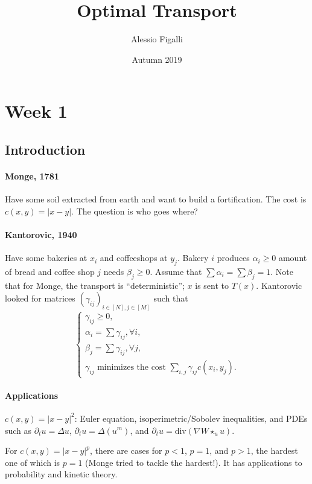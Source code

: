 \documentclass[oneside,leqno,11pt]{amsart}
\numberwithin{equation}{section}
\begin{document}
\title{Optimal Transport}
\author{Alessio Figalli}
\date{Autumn 2019}

\maketitle

\section{Week 1}
\subsection{Introduction}
\paragraph{Monge, 1781} Have some soil extracted from earth and want to build a fortification. The cost is $c(x,y) = |x-y|$. The question is who goes where?

\paragraph{Kantorovic, 1940} Have some bakeries at $x_i$ and coffeeshops at $y_j$. Bakery $i$ produces $\alpha_i \geq 0$ amount of bread and coffee shop $j$ needs $\beta_j \geq 0$. Assume that $\sum \alpha_i = \sum \beta_j =  1$. Note that for Monge, the transport is ``deterministic''; $x$ is sent to $T(x)$. Kantorovic looked for matrices $(\gamma_{ij})_{i\in [N], j\in [M]}$ such that
\[
    \left\{ \begin{array}{l}
            \gamma_{ij} \geq 0, \\
            \alpha_i = \sum \gamma_{ij}, \forall i, \\
            \beta_j = \sum \gamma_{ij}, \forall j,\\
            \gamma_{ij} \text{ minimizes the cost } \sum_{i,j} \gamma_{ij}c(x_i, y_j).
    \end{array} \right.
\] 

\paragraph{Applications} $c(x,y) = |x-y|^2$: Euler equation, isoperimetric/Sobolev inequalities, and PDEs such as $\partial_t u = \Delta u$, $\partial_t u = \Delta(u^m)$, and $\partial_t u = \mathrm{div}(\nabla W \star_u u)$. 

For $c(x,y) = |x-y|^p$, there are cases for $p < 1$, $p=1$, and $p > 1$, the hardest one of which is $p=1$ (Monge tried to tackle the hardest!). It has applications to probability and kinetic theory.
\end{document}
